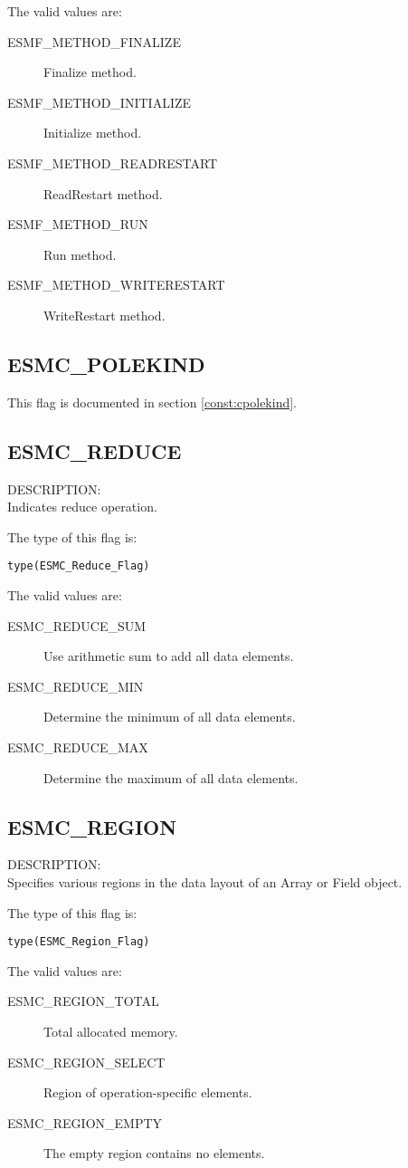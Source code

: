 The valid values are:
\begin{description}
\item [ESMF\_METHOD\_FINALIZE]
      Finalize method.
\item [ESMF\_METHOD\_INITIALIZE]
      Initialize method.
\item [ESMF\_METHOD\_READRESTART]
      ReadRestart method.
\item [ESMF\_METHOD\_RUN]
      Run method.
\item [ESMF\_METHOD\_WRITERESTART]
      WriteRestart method.
\end{description}

\subsection{ESMC\_POLEKIND}
This flag is documented in section \ref{const:cpolekind}.

\subsection{ESMC\_REDUCE}
\label{const:creduce}
{\sf DESCRIPTION:\\}
Indicates reduce operation.

The type of this flag is:

{\tt type(ESMC\_Reduce\_Flag)}

The valid values are:
\begin{description}
\item [ESMC\_REDUCE\_SUM]
      Use arithmetic sum to add all data elements.
\item [ESMC\_REDUCE\_MIN]
      Determine the minimum of all data elements.
\item [ESMC\_REDUCE\_MAX]
      Determine the maximum of all data elements.
\end{description}

\subsection{ESMC\_REGION}
\label{const:cregion}
{\sf DESCRIPTION:\\}
Specifies various regions in the data layout of an Array or Field object.

The type of this flag is:

{\tt type(ESMC\_Region\_Flag)}

The valid values are:
\begin{description}
\item [ESMC\_REGION\_TOTAL]
      Total allocated memory.
\item [ESMC\_REGION\_SELECT]
      Region of operation-specific elements.
\item [ESMC\_REGION\_EMPTY]
      The empty region contains no elements.
\end{description}

